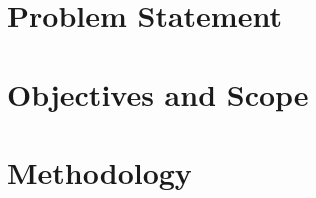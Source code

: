 \documentclass[.../main.tex]{subfiles}
\begin{document}
    
    
    \section{Problem Statement} \label{sec::Problem_Statement}

    \section{Objectives and Scope} \label{sec::Objectives_and_Scope}

    \section{Methodology} \label{sec::Methodology}
\end{document}
